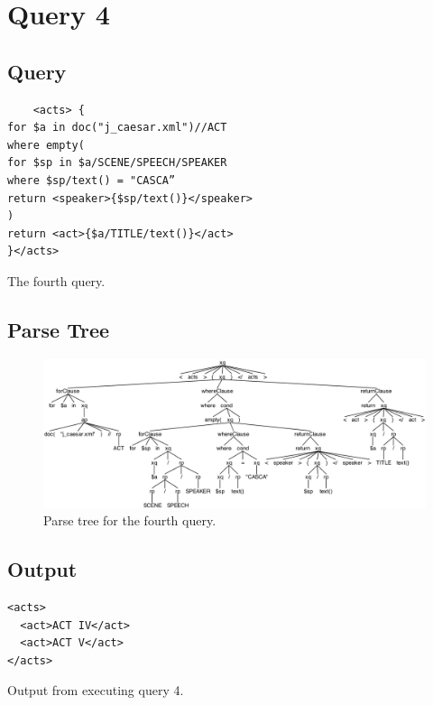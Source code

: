 \documentclass{article}
\begin{document}
\section{Query 4}

\subsection{Query}
\begin{listing}[H]
  \begin{verbatim}
    <acts> {
for $a in doc("j_caesar.xml")//ACT
where empty(
for $sp in $a/SCENE/SPEECH/SPEAKER
where $sp/text() = "CASCA”
return <speaker>{$sp/text()}</speaker>
)
return <act>{$a/TITLE/text()}</act>
}</acts>
  \end{verbatim}
  \caption{The fourth query.}\label{lst:query4}
\end{listing}

\subsection{Parse Tree}
\begin{figure}[H]
  \centering
  \includegraphics[width=\linewidth]{imgs/antlr4_parse_tree_query_4.png}
  \caption{Parse tree for the fourth query.}\label{fig:parseTree4}
\end{figure}

\subsection{Output}
\begin{listing}[H]
\begin{verbatim}
<acts>
  <act>ACT IV</act>
  <act>ACT V</act>
</acts>
\end{verbatim}
\caption{Output from executing query 4.}\label{lst:res4}
\end{listing}
\end{document}
